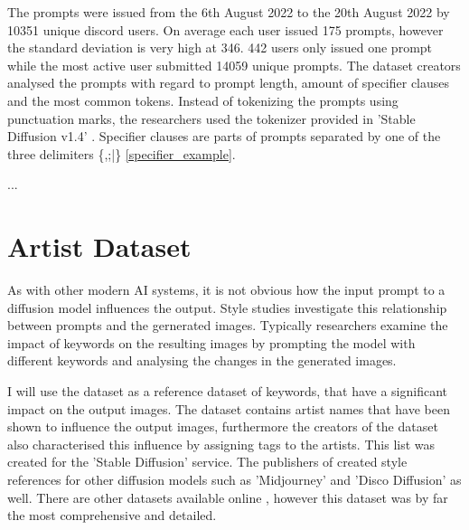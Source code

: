The prompts were issued from the 6th August 2022 to the 20th August 2022 by 10351 unique discord users. On average each user issued 175 prompts, however the standard deviation is very high at 346. 442 users only issued one prompt while the most active user submitted 14059 unique prompts. 
The dataset creators \autocite{poloclub-diffusiondb} analysed the prompts with regard to prompt length, amount of specifier clauses and the most common tokens. Instead of tokenizing the prompts using punctuation marks, the researchers used the tokenizer provided in 'Stable Diffusion v1.4' \autocite{sd}. Specifier clauses are parts of prompts separated by one of the three delimiters \{,;|\} \ref{specifier_example}. 




...

\section{Artist Dataset}
\label{cha:Artist Dataset}

As with other modern AI systems, it is not obvious how the input prompt to a diffusion model influences the output. Style studies investigate this relationship between prompts and the gernerated images. Typically researchers examine the impact of keywords on the resulting images by prompting the model with different keywords and analysing the changes in the generated images.

I will use the dataset \autocite{thelist} as a reference dataset of keywords, that have a significant impact on the output images. The dataset contains artist names that have been shown to influence the output images, furthermore the creators of the dataset also characterised this influence by assigning tags to the artists. This list was created for the 'Stable Diffusion' service. The publishers of \autocite{thelist} created style references for other diffusion models such as 'Midjourney' and 'Disco Diffusion' as well.
There are other datasets available online \autocite{sd-fr}, however this dataset was by far the most comprehensive and detailed. 

